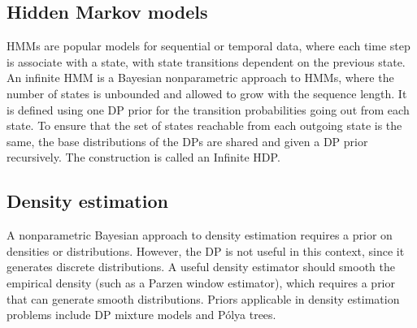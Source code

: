 \subsection{Hidden Markov models}
\glspl{HMM} are popular models for sequential or temporal data, where each time step is associate with a state, with state transitions dependent on the previous state. An infinite \gls{HMM} \cite{Beal02theinfinite} is a Bayesian nonparametric approach to \glspl{HMM}, where the number of states is unbounded and allowed to grow with the sequence length. It is defined using one \gls{DP} prior for the transition probabilities going out from each state. To ensure that the set of states reachable from each outgoing state is the same, the base distributions of the \glspl{DP} are shared and given a \gls{DP} prior recursively. The construction is called an Infinite \gls{HDP}.

\subsection{Density estimation}
A nonparametric Bayesian approach to density estimation \cite{Escobar94bayesiandensity} requires a prior on densities or distributions. However, the \gls{DP} is not useful in this context, since it generates discrete distributions. A useful density estimator should smooth the empirical density (such as a Parzen window estimator), which requires a prior that can generate smooth distributions. Priors applicable in density estimation problems include \gls{DP} mixture models and Pólya trees.





